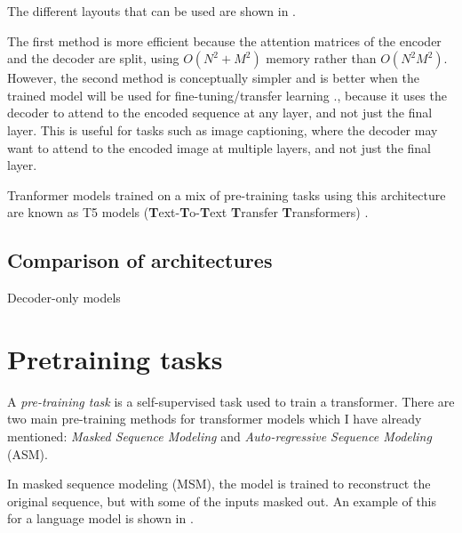 The different layouts that can be used are shown in .

The first method is more efficient because the attention matrices of the encoder and the decoder are split, using $O(N^2 +M^2)$ memory rather than $O(N^2M^2)$. However, the second method is conceptually simpler and is better when the trained model will be used for fine-tuning/transfer learning \cite{t5}., because it uses the  decoder to attend to the encoded sequence at any layer, and not just the final layer. This is useful for tasks such as image captioning, where the decoder may want to attend to the encoded image at multiple layers, and not just the final layer.

Tranformer models trained on a mix of pre-training tasks using this architecture are known as T5 models (\textbf{T}ext-\textbf{T}o-\textbf{T}ext \textbf{T}ransfer \textbf{T}ransformers) \cite{t5}.

\subsection{Comparison of architectures}

Decoder-only models



\section{Pretraining tasks}
\label{ss:pretraining}
A \textit{pre-training task} is a self-supervised task used to train a transformer. There are two main pre-training methods for transformer models which I have already mentioned: \textit{Masked Sequence Modeling} and \textit{Auto-regressive Sequence Modeling} (ASM).

In masked sequence modeling (MSM), the model is trained to reconstruct the original sequence, but with some of the inputs masked out. An example of this for a language model is shown in .


